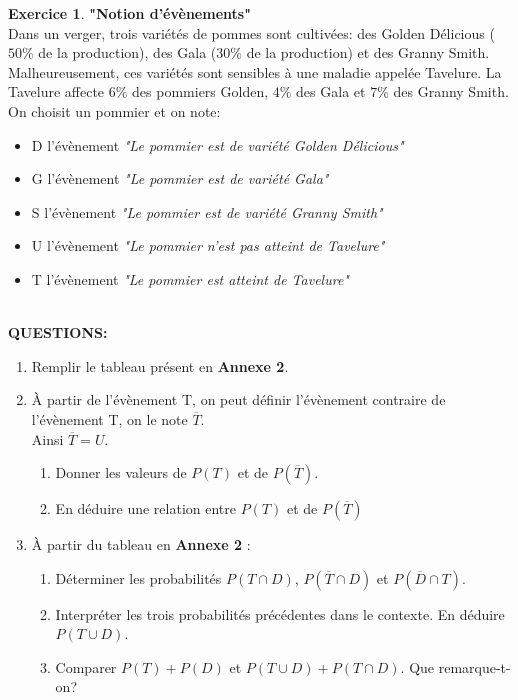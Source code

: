 \documentclass[a4paper,11pt]{article}
\theoremstyle{definition}
\newtheorem{exo}{Exercice}
\begin{document}
\begin{exo}\textbf{"Notion d'évènements"}\hfill\\[0.25cm]
	Dans un verger, trois variétés de pommes sont cultivées: des Golden Délicious ($50 \%$ de la production), des Gala ($30 \%$ de la production) et des Granny Smith. Malheureusement, ces variétés sont sensibles à une maladie appelée Tavelure. La Tavelure affecte $6\%$ des pommiers Golden, $4\%$ des Gala et $7\%$ des Granny Smith. \\[0.1cm]
	
	On choisit un pommier et on note:\\
	\begin{itemize}[$\square$]
		\item D l'évènement \textit{"Le pommier est de variété Golden Délicious"}
		\item G l'évènement \textit{"Le pommier est de variété Gala"}
		\item S l'évènement \textit{"Le pommier est de variété Granny Smith"}
		\item U l'évènement \textit{"Le pommier n'est pas atteint de Tavelure"}
		\item T l'évènement \textit{"Le pommier est atteint de Tavelure"}
	\end{itemize}
	\hfill \\
	\textbf{QUESTIONS:}
	
	
	\begin{enumerate}
		\item Remplir le tableau présent en \textbf{Annexe 2}.
		\item À partir de l'évènement T, on peut définir l'évènement contraire de l'évènement T, on le note $\overline{T}$.\\ Ainsi $\overline{T} = U$. 
		\begin{enumerate}
			\item Donner les valeurs de $P(T)$ et de $P(\overline{T})$.  
			\item En déduire une relation entre $P(T)$ et de $P(\overline{T})$
		\end{enumerate}
		\item À partir du tableau en \textbf{Annexe 2} :
		\begin{enumerate}
			\item Déterminer les probabilités $P(T \cap D)$, $P(\overline{T} \cap D)$ et $P(\overline{D} \cap T)$. 
			\item Interpréter les trois probabilités précédentes dans le contexte. En déduire $P(T \cup D)$.
			\item Comparer $P(T) + P(D)$ et $P(T \cup D) + P(T \cap D)$. Que remarque-t-on?
		\end{enumerate}
		
	\end{enumerate}	  
\end{exo}
\end{document}
